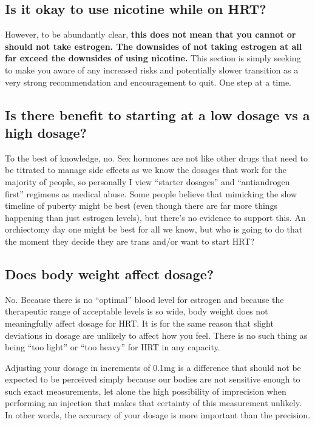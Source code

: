 \documentclass{article}
\begin{document}
\subsection{Is it okay to use nicotine while on HRT?}\label{11-2}


However, to be abundantly clear, \textbf{this does not mean that you cannot or should not take estrogen. The downsides of not taking estrogen at all far exceed the downsides of using nicotine.} This section is simply seeking to make you aware of any increased risks and potentially slower transition as a very strong recommendation and encouragement to quit. One step at a time.

\subsection{Is there benefit to starting at a low dosage vs a high dosage?}

To the best of knowledge, no. Sex hormones are not like other drugs that need to be titrated to manage side effects as we know the dosages that work for the majority of people, so personally I view “starter dosages” and “antiandrogen first” regimens as medical abuse. Some people believe that mimicking the slow timeline of puberty might be best (even though there are far more things happening than just estrogen levels), but there’s no evidence to support this. An orchiectomy day one might be best for all we know, but who is going to do that the moment they decide they are trans and/or want to start HRT?


\subsection{Does body weight affect dosage?}

No. Because there is no “optimal” blood level for estrogen and because the therapeutic range of acceptable levels is so wide, body weight does not meaningfully affect dosage for HRT. It is for the same reason that slight deviations in dosage are unlikely to affect how you feel. There is no such thing as being “too light” or “too heavy” for HRT in any capacity.

Adjusting your dosage in increments of 0.1mg is a difference that should not be expected to be perceived simply because our bodies are not sensitive enough to such exact measurements, let alone the high possibility of imprecision when performing an injection that makes that certainty of this measurement unlikely. In other words, the accuracy of your dosage is more important than the precision.
\end{document}
